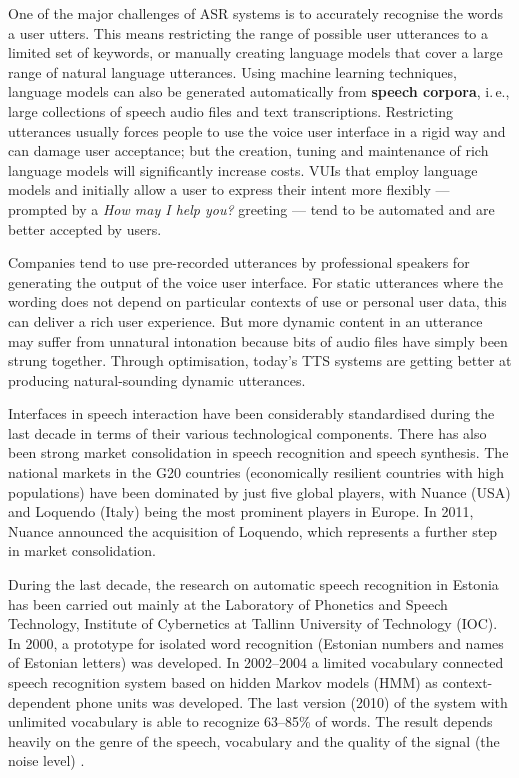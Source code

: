 \begin{multicols}{2}
One of the major challenges of ASR systems is to accurately recognise the words a user utters. This means restricting the range of possible user utterances to a limited set of keywords, or manually creating language models that cover a large range of natural language utterances. Using machine learning techniques, language models can also be generated automatically from \textbf{speech corpora}, i.\,e., large collections of speech audio files and text transcriptions. Restricting utterances usually forces people to use the voice user interface in a rigid way and can damage user acceptance; but the creation, tuning and maintenance of rich language models will significantly increase costs. VUIs that employ language models and initially allow a user to express their intent more flexibly — prompted by a \textit{How may I help you?} greeting — tend to be automated and are better accepted by users.


Companies tend to use pre-recorded utterances by professional speakers for generating the output of the voice user interface. For static utterances where the wording does not depend on particular contexts of use or personal user data, this can deliver a rich user experience. But more dynamic content in an utterance may suffer from unnatural intonation because bits of audio files have simply been strung together. Through optimisation, today’s TTS systems are getting better at producing natural-sounding dynamic utterances.

Interfaces in speech interaction have been considerably standardised during the last decade in terms of their various technological components. There has also been strong market consolidation in speech recognition and speech synthesis. The national markets in the G20 countries (economically resilient countries with high populations) have been dominated by just five global players, with Nuance (USA) and Loquendo (Italy) being the most prominent players in Europe. In 2011, Nuance announced the acquisition of Loquendo, which represents a further step in market consolidation.

During the last decade, the research on automatic speech recognition in Estonia has been carried out mainly at the Laboratory of Phonetics and Speech Technology, Institute of Cybernetics at Tallinn University of Technology (IOC). 
In 2000, a prototype for isolated word recognition (Estonian numbers and names of Estonian letters) was developed. In 2002--2004 a limited vocabulary connected speech recognition system based on hidden Markov models (HMM) as context-dependent phone units was developed. 
The last version (2010) of the system with unlimited vocabulary is able to recognize 63--85\% of words. 
The result depends heavily on the genre of the speech, vocabulary and the quality of the signal (the noise level) \cite{Phon}.


\end{multicols}
